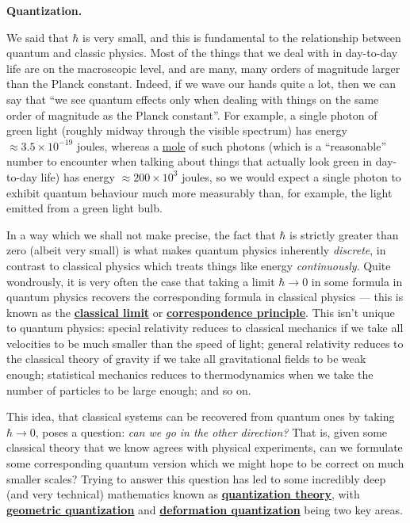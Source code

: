 \documentclass[fleqn,a4paper]{article}
\newenvironment{technical}[1]{\textbf{#1.}\par\vspace{.5\baselineskip}\everypar{\setlength{\parindent}{1.5em}}}{}
\theoremstyle{definition}
\theoremstyle{definition}
\theoremstyle{definition}
\theoremstyle{definition}
\theoremstyle{remark}
\begin{document}
\begin{technical}{Quantization}
We said that \(\hbar\) is very small, and this is fundamental to the relationship between quantum and classic physics.
Most of the things that we deal with in day-to-day life are on the macroscopic level, and are many, many orders of magnitude larger than the Planck constant.
Indeed, if we wave our hands quite a lot, then we can say that ``we see quantum effects only when dealing with things on the same order of magnitude as the Planck constant''.
For example, a single photon of green light (roughly midway through the visible spectrum) has energy \(\approx3.5\times10^{-19}\) joules, whereas a \href{https://en.wikipedia.org/wiki/Mole_(unit)}{mole} of such photons (which is a ``reasonable'' number to encounter when talking about things that actually look green in day-to-day life) has energy \(\approx200\times10^{3}\) joules, so we would expect a single photon to exhibit quantum behaviour much more measurably than, for example, the light emitted from a green light bulb.

In a way which we shall not make precise, the fact that \(\hbar\) is strictly greater than zero (albeit very small) is what makes quantum physics inherently \emph{discrete}, in contrast to classical physics which treats things like energy \emph{continuously}.
Quite wondrously, it is very often the case that taking a limit \(\hbar\to0\) in some formula in quantum physics recovers the corresponding formula in classical physics --- this is known as the \href{https://en.wikipedia.org/wiki/Classical_limit}{\textbf{classical limit}} or \href{https://en.wikipedia.org/wiki/Correspondence_principle}{\textbf{correspondence principle}}.
This isn't unique to quantum physics: special relativity reduces to classical mechanics if we take all velocities to be much smaller than the speed of light; general relativity reduces to the classical theory of gravity if we take all gravitational fields to be weak enough; statistical mechanics reduces to thermodynamics when we take the number of particles to be large enough; and so on.

This idea, that classical systems can be recovered from quantum ones by taking \(\hbar\to0\), poses a question: \emph{can we go in the other direction?}
That is, given some classical theory that we know agrees with physical experiments, can we formulate some corresponding quantum version which we might hope to be correct on much smaller scales?
Trying to answer this question has led to some incredibly deep (and very technical) mathematics known as \href{https://en.wikipedia.org/wiki/Quantization_(physics)}{\textbf{quantization theory}}, with \href{https://en.wikipedia.org/wiki/Geometric_quantization}{\textbf{geometric quantization}} and \href{https://en.wikipedia.org/wiki/Wigner\%E2\%80\%93Weyl_transform\#Deformation_quantization}{\textbf{deformation quantization}} being two key areas.

\end{technical}
\end{document}
